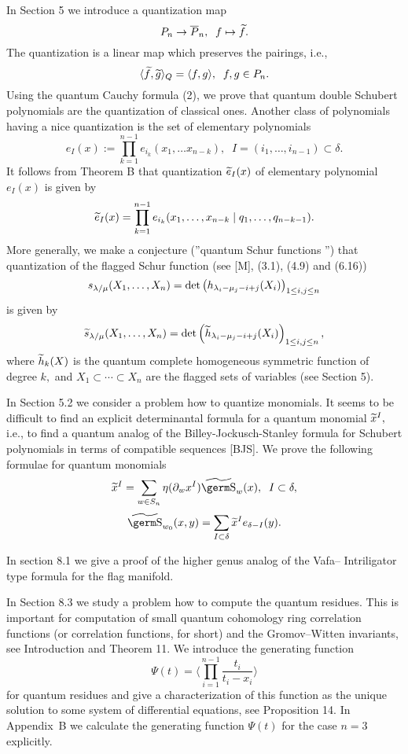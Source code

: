 {In Section 5 we introduce a quantization map 
\[ P_n \rightarrow \overline{P}_n, \; \; f \mapsto \widetilde{f}. \] 
The quantization is a linear map which preserves the pairings, i.e., 
\[ \langle \widetilde{f},\widetilde{g} \rangle _{Q} = \langle f,g \rangle , \; \; 
f,g \in P_n. \] 
Using the quantum Cauchy formula (2), we prove that quantum double 
Schubert polynomials are the quantization of classical ones. 
Another class of polynomials having a nice quantization is the set of 
elementary polynomials 
\[ e_I(x) := \prod_{k=1}^{n-1}e_{i_k}(x_1,\ldots x_{n-k}), \; \; 
I=(i_1,\ldots ,i_{n-1})\subset \delta . \] 
It follows from Theorem B that quantization $\widetilde{e}_I(x)$ of elementary 
polynomial $e_I(x)$ is given by 
\[ \widetilde{e}_I(x) = \prod_{k=1}^{n-1} e_{i_k}(x_1,\ldots ,x_{n-k}
\mid q_1,\ldots ,q_{n-k-1} ). \] 
More generally, we make a conjecture (''quantum Schur functions '') that 
quantization of the flagged Schur function (see [M], (3.1), (4.9) and (6.16)) 
\[ s_{\lambda / \mu }(X_1,\ldots ,X_n) = 
{\rm det}\left( h_{\lambda_i-\mu_j-i+j}(X_i)\right) _{1\leq i,j \leq n} \] 
is given by 
\[ \widetilde{s}_{\lambda / \mu }(X_1,\ldots ,X_n) = 
{\rm det}\left( \widetilde{h}_{\lambda_i-\mu_j-i+j}(X_i)\right) 
_{1\leq i,j \leq n}, \] 
where $\widetilde{h}_k(X)$ is the quantum complete homogeneous symmetric function 
of degree $k,$ and $X_1\subset \cdots \subset X_n$ are the flagged sets of 
variables (see Section 5). 

In Section 5.2 we consider a problem how to quantize monomials. It seems 
to be difficult to find an explicit determinantal formula for a quantum 
monomial $\widetilde{x}^I,$ i.e., to find a quantum analog of the 
Billey-Jockusch-Stanley formula for Schubert polynomials in terms of 
compatible sequences [BJS]. We prove the following formulae for 
quantum monomials 
\[ \wt{x}^I = \sum_{w\in S_n} \eta (\partial _{w}x^I ) \wt{\s}_w(x), 
\; \; I\subset \delta, \] 
\[ \wt{\s}_{w_0}(x,y) = \sum_{I\subset \delta}\wt{x}^I 
e_{\delta - I}(y). \] 

In section 8.1 we give a proof of the higher genus analog of the Vafa--\break
Intriligator type formula for the flag manifold. 

In Section 8.3 we study a problem how to compute the quantum residues. 
This is important for computation of small quantum cohomology ring 
correlation functions (or correlation functions, for short) and the
Gromov--Witten invariants, see Introduction and Theorem 11. We introduce 
the generating function 
\[ \Psi(t)= \langle \prod_{i=1}^{n-1}\frac{t_i}{t_i - x_i} \rangle \]
for quantum residues and give a characterization of this function as the 
unique solution to some system of differential equations, see Proposition 14. 
In Appendix~B we calculate the generating function $\Psi(t)$ for 
the case $n=3$ explicitly. 

}

